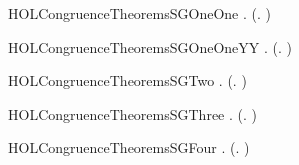 \newcommand{\HOLCongruenceTheoremsSGOneZero}{\UseVerbatim{HOLCongruenceTheoremsSGOneZero}}
\begin{SaveVerbatim}{HOLCongruenceTheoremsSGOneOne}
\HOLTokenTurnstile{} \HOLSymConst{\HOLTokenForall{}}  .  (\HOLTokenLambda{}. \HOLConst{\ensuremath{\tau}}  \HOLSymConst{+}   ) \HOLSymConst{\HOLTokenImp{}}  
\end{SaveVerbatim}
\newcommand{\HOLCongruenceTheoremsSGOneOne}{\UseVerbatim{HOLCongruenceTheoremsSGOneOne}}
\begin{SaveVerbatim}{HOLCongruenceTheoremsSGOneOneYY}
\HOLTokenTurnstile{} \HOLSymConst{\HOLTokenForall{}}  .  (\HOLTokenLambda{}.    \HOLSymConst{+} \HOLConst{\ensuremath{\tau}} ) \HOLSymConst{\HOLTokenImp{}}  
\end{SaveVerbatim}
\newcommand{\HOLCongruenceTheoremsSGOneOneYY}{\UseVerbatim{HOLCongruenceTheoremsSGOneOneYY}}
\begin{SaveVerbatim}{HOLCongruenceTheoremsSGTwo}
\HOLTokenTurnstile{} \HOLSymConst{\HOLTokenForall{}} .   \HOLSymConst{\HOLTokenImp{}}  (\HOLTokenLambda{}.   )
\end{SaveVerbatim}
\newcommand{\HOLCongruenceTheoremsSGTwo}{\UseVerbatim{HOLCongruenceTheoremsSGTwo}}
\begin{SaveVerbatim}{HOLCongruenceTheoremsSGThree}
\HOLTokenTurnstile{} \HOLSymConst{\HOLTokenForall{}} .   \HOLSymConst{\HOLTokenImp{}}  (\HOLTokenLambda{}.  )
\end{SaveVerbatim}
\newcommand{\HOLCongruenceTheoremsSGThree}{\UseVerbatim{HOLCongruenceTheoremsSGThree}}
\begin{SaveVerbatim}{HOLCongruenceTheoremsSGFour}
\HOLTokenTurnstile{} \HOLSymConst{\HOLTokenForall{}} .   \HOLSymConst{\HOLTokenConj{}}   \HOLSymConst{\HOLTokenImp{}}  (\HOLTokenLambda{}.   \HOLSymConst{+}  )
\end{SaveVerbatim}
